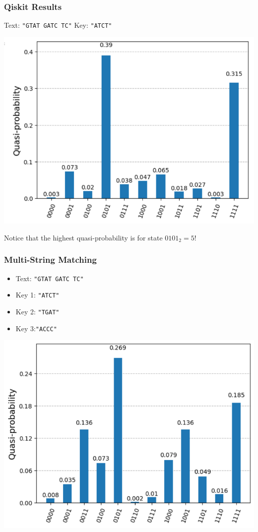 \documentclass[
	11pt, %
]{beamer}
\begin{document}
\begin{frame}
    \frametitle{Qiskit Results}
    Text: \texttt{"GTAT GATC TC"}
    Key: \texttt{"ATCT"}

    \begin{center}
        \includegraphics[scale=0.5]{aer_search.png}
    \end{center}
    Notice that the highest quasi-probability is for state $0101_2 = 5$! 
\end{frame}


\begin{frame}
    \frametitle{Multi-String Matching}
    \begin{itemize}
        \item Text: \texttt{"GTAT GATC TC"}
        \item Key 1: \texttt{"ATCT"}
        \item Key 2: \texttt{"TGAT"}
        \item Key 3:\texttt{"ACCC"}
    \end{itemize}

    \begin{center}
        \includegraphics[scale=0.5]{aer_multi_string_match.png}
    \end{center}
\end{frame}
\end{document}
